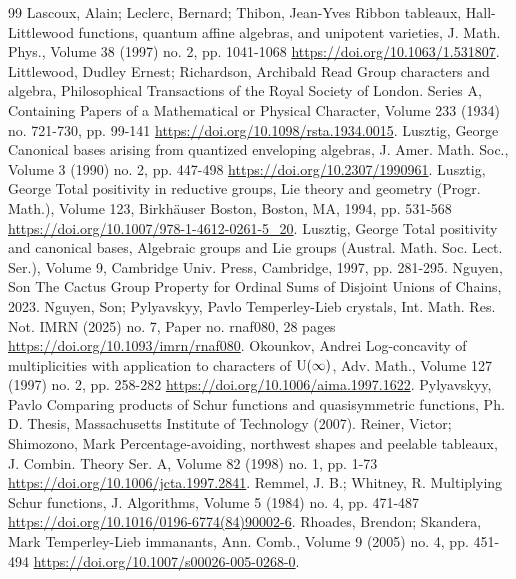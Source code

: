 \begin{thebibliography}{99}
 Lascoux, Alain; Leclerc, Bernard; Thibon, Jean-Yves Ribbon tableaux, Hall-Littlewood functions, quantum affine algebras, and unipotent varieties, J. Math. Phys., Volume 38 (1997) no. 2, pp. 1041-1068 \url{https://doi.org/10.1063/1.531807}.
 Littlewood, Dudley Ernest; Richardson, Archibald Read Group characters and algebra, Philosophical Transactions of the Royal Society of London. Series A, Containing Papers of a Mathematical or Physical Character, Volume 233 (1934) no. 721-730, pp. 99-141 \url{https://doi.org/10.1098/rsta.1934.0015}.
 Lusztig, George Canonical bases arising from quantized enveloping algebras, J. Amer. Math. Soc., Volume 3 (1990) no. 2, pp. 447-498 \url{https://doi.org/10.2307/1990961}.
 Lusztig, George Total positivity in reductive groups, Lie theory and geometry (Progr. Math.), Volume 123, Birkhäuser Boston, Boston, MA, 1994, pp. 531-568 \url{https://doi.org/10.1007/978-1-4612-0261-5_20}.
 Lusztig, George Total positivity and canonical bases, Algebraic groups and Lie groups (Austral. Math. Soc. Lect. Ser.), Volume 9, Cambridge Univ. Press, Cambridge, 1997, pp. 281-295.
 Nguyen, Son The Cactus Group Property for Ordinal Sums of Disjoint Unions of Chains, 2023.
 Nguyen, Son; Pylyavskyy, Pavlo Temperley-Lieb crystals, Int. Math. Res. Not. IMRN (2025) no. 7, Paper no. rnaf080, 28 pages \url{https://doi.org/10.1093/imrn/rnaf080}.
 Okounkov, Andrei Log-concavity of multiplicities with application to characters of ${\rm {U}}(\infty )$, Adv. Math., Volume 127 (1997) no. 2, pp. 258-282 \url{https://doi.org/10.1006/aima.1997.1622}.
 Pylyavskyy, Pavlo Comparing products of Schur functions and quasisymmetric functions, Ph. D. Thesis, Massachusetts Institute of Technology (2007).
 Reiner, Victor; Shimozono, Mark Percentage-avoiding, northwest shapes and peelable tableaux, J. Combin. Theory Ser. A, Volume 82 (1998) no. 1, pp. 1-73 \url{https://doi.org/10.1006/jcta.1997.2841}.
 Remmel, J. B.; Whitney, R. Multiplying Schur functions, J. Algorithms, Volume 5 (1984) no. 4, pp. 471-487 \url{https://doi.org/10.1016/0196-6774(84)90002-6}.
 Rhoades, Brendon; Skandera, Mark Temperley-Lieb immanants, Ann. Comb., Volume 9 (2005) no. 4, pp. 451-494 \url{https://doi.org/10.1007/s00026-005-0268-0}.

\end{thebibliography}
